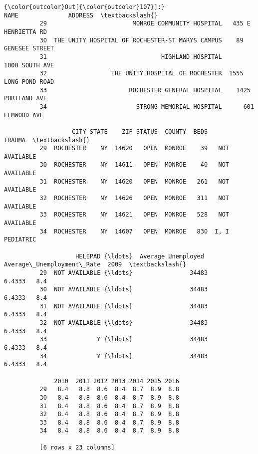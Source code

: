 \documentclass[11pt]{article}
\begin{document}
\begin{Verbatim}[commandchars=\\\{\}]
{\color{outcolor}Out[{\color{outcolor}107}]:}                                                NAME              ADDRESS  \textbackslash{}
          29                        MONROE COMMUNITY HOSPITAL   435 E HENRIETTA RD   
          30  THE UNITY HOSPITAL OF ROCHESTER-ST MARYS CAMPUS    89 GENESEE STREET   
          31                                HIGHLAND HOSPITAL       1000 SOUTH AVE   
          32                  THE UNITY HOSPITAL OF ROCHESTER  1555 LONG POND ROAD   
          33                       ROCHESTER GENERAL HOSPITAL    1425 PORTLAND AVE   
          34                         STRONG MEMORIAL HOSPITAL      601 ELMWOOD AVE   
          
                   CITY STATE    ZIP STATUS  COUNTY  BEDS          TRAUMA  \textbackslash{}
          29  ROCHESTER    NY  14620   OPEN  MONROE    39   NOT AVAILABLE   
          30  ROCHESTER    NY  14611   OPEN  MONROE    40   NOT AVAILABLE   
          31  ROCHESTER    NY  14620   OPEN  MONROE   261   NOT AVAILABLE   
          32  ROCHESTER    NY  14626   OPEN  MONROE   311   NOT AVAILABLE   
          33  ROCHESTER    NY  14621   OPEN  MONROE   528   NOT AVAILABLE   
          34  ROCHESTER    NY  14607   OPEN  MONROE   830  I, I PEDIATRIC   
          
                    HELIPAD {\ldots}  Average Unemployed   Average\_Unemployment\_Rate  2009  \textbackslash{}
          29  NOT AVAILABLE {\ldots}                34483                     6.4333   8.4   
          30  NOT AVAILABLE {\ldots}                34483                     6.4333   8.4   
          31  NOT AVAILABLE {\ldots}                34483                     6.4333   8.4   
          32  NOT AVAILABLE {\ldots}                34483                     6.4333   8.4   
          33              Y {\ldots}                34483                     6.4333   8.4   
          34              Y {\ldots}                34483                     6.4333   8.4   
          
              2010  2011 2012 2013 2014 2015 2016  
          29   8.4   8.8  8.6  8.4  8.7  8.9  8.8  
          30   8.4   8.8  8.6  8.4  8.7  8.9  8.8  
          31   8.4   8.8  8.6  8.4  8.7  8.9  8.8  
          32   8.4   8.8  8.6  8.4  8.7  8.9  8.8  
          33   8.4   8.8  8.6  8.4  8.7  8.9  8.8  
          34   8.4   8.8  8.6  8.4  8.7  8.9  8.8  
          
          [6 rows x 23 columns]
\end{Verbatim}
            
\end{document}

